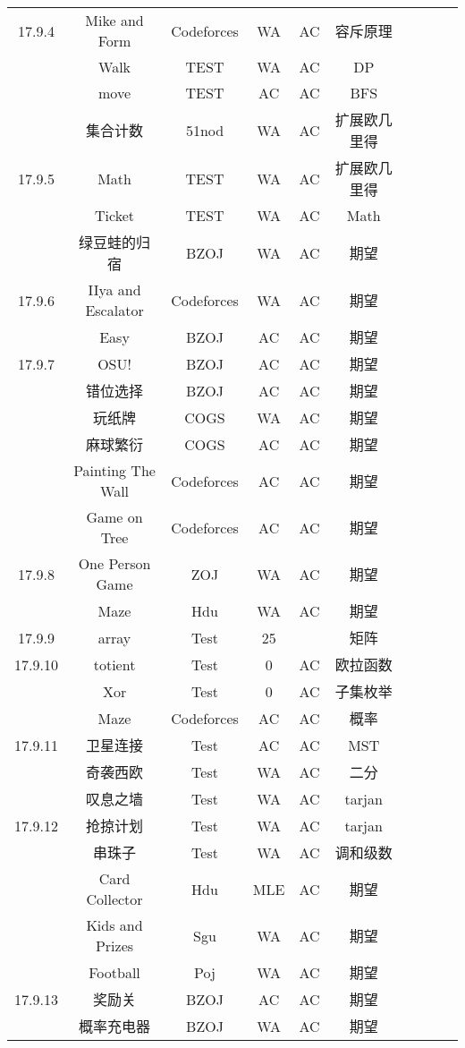 \documentclass[landscape]{article}
\begin{document}
\begin{longtable}{cccccccccc}
  \hline
  17.9.4 & Mike and Form & Codeforces & WA & AC & 容斥原理\\
  & Walk & TEST & WA & AC & DP\\
  & move & TEST & AC & AC & BFS\\
  & 集合计数 & 51nod & WA & AC & 扩展欧几里得\\
  \hline
  17.9.5 & Math & TEST & WA & AC & 扩展欧几里得\\
  & Ticket & TEST & WA & AC & Math\\
  & 绿豆蛙的归宿 & BZOJ & WA & AC & 期望\\
  \hline
  17.9.6 & IIya and Escalator & Codeforces & WA & AC & 期望\\
  & Easy & BZOJ & AC & AC & 期望\\
  \hline
  17.9.7 & OSU! & BZOJ & AC & AC & 期望\\
  & 错位选择 & BZOJ & AC & AC & 期望\\
  & 玩纸牌 & COGS & WA & AC & 期望\\
  & 麻球繁衍 & COGS & AC & AC & 期望\\
  & Painting The Wall & Codeforces & AC & AC & 期望\\
  & Game on Tree & Codeforces & AC & AC & 期望\\
  \hline
  17.9.8 & One Person Game & ZOJ & WA & AC & 期望\\
  & Maze & Hdu & WA & AC & 期望\\
  \hline
  17.9.9 & array & Test & 25 &  & 矩阵\\
  \hline
  17.9.10 & totient & Test & 0 & AC & 欧拉函数\\
  & Xor & Test & 0 & AC & 子集枚举\\
  & Maze & Codeforces & AC & AC & 概率\\
  \hline
  17.9.11 & 卫星连接 & Test & AC & AC & MST\\
  &奇袭西欧& Test &WA &AC &二分\\
  &叹息之墙 &Test &WA& AC &tarjan\\
  \hline
  17.9.12 & 抢掠计划 &Test& WA& AC& tarjan\\
  &串珠子 &Test& WA& AC& 调和级数\\
  &Card Collector& Hdu &MLE &AC &期望\\
  &Kids and Prizes& Sgu &WA &AC& 期望\\
  &Football &Poj& WA& AC &期望\\
  \hline
  17.9.13 &奖励关 &BZOJ &AC &AC &期望\\
  & 概率充电器 &BZOJ &WA &AC& 期望\\

\end{longtable}
\end{document}
